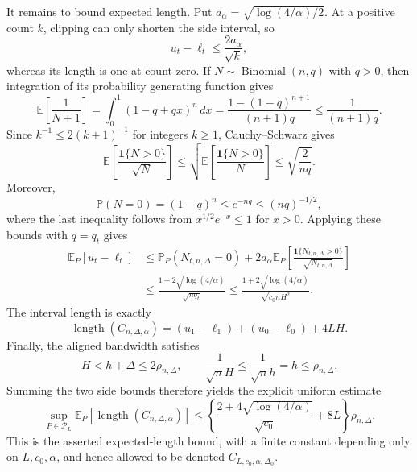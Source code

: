 It remains to bound expected length.  Put \(a_\alpha=\sqrt{\log(4/\alpha)/2}\).  At a positive count \(k\), clipping can only shorten the side interval, so
\[
 u_t-\ell_t\leq\frac{2a_\alpha}{\sqrt{k}},
\]
whereas its length is one at count zero.  If \(N\sim\operatorname{Binomial}(n,q)\) with \(q>0\), then integration of its probability generating function gives
\[
 \mathbb E\!\left[\frac1{N+1}\right]
 =\int_0^1(1-q+qx)^n\,dx
 =\frac{1-(1-q)^{n+1}}{(n+1)q}
 \leq\frac1{(n+1)q}.
\]
Since \(k^{-1}\leq2(k+1)^{-1}\) for integers \(k\geq1\), Cauchy--Schwarz gives
\[
 \mathbb E\!\left[\frac{\mathbf1\{N>0\}}{\sqrt N}\right]
 \leq\sqrt{\mathbb E\!\left[\frac{\mathbf1\{N>0\}}N\right]}
 \leq\sqrt{\frac2{nq}}.
\]
Moreover,
\[
 \mathbb P(N=0)=(1-q)^n\leq e^{-nq}\leq(nq)^{-1/2},
\]
where the last inequality follows from \(x^{1/2}e^{-x}\leq1\) for \(x>0\).  Applying these bounds with \(q=q_t\) gives
\[
 \begin{aligned}
 \mathbb E_P[u_t-\ell_t]
 &\leq \mathbb P_P(N_{t,n,\Delta}=0)
   +2a_\alpha\mathbb E_P\!\left[
      \frac{\mathbf1\{N_{t,n,\Delta}>0\}}{\sqrt{N_{t,n,\Delta}}}
    \right]\\
 &\leq\frac{1+2\sqrt{\log(4/\alpha)}}{\sqrt{nq_t}}
 \leq\frac{1+2\sqrt{\log(4/\alpha)}}{\sqrt{c_0nH^2}}.
 \end{aligned}
\]
The interval length is exactly
\[
 \operatorname{length}(C_{n,\Delta,\alpha})
 =(u_1-\ell_1)+(u_0-\ell_0)+4LH.
\]
Finally, the aligned bandwidth satisfies
\[
 H<h+\Delta\leq2\rho_{n,\Delta},
 \qquad
 \frac1{\sqrt nH}\leq\frac1{\sqrt nh}=h\leq\rho_{n,\Delta}.
\]
Summing the two side bounds therefore yields the explicit uniform estimate
\[
 \sup_{P\in\mathcal P_L}\mathbb E_P[\operatorname{length}(C_{n,\Delta,\alpha})]
 \leq
 \left\{
 \frac{2+4\sqrt{\log(4/\alpha)}}{\sqrt{c_0}}+8L
 \right\}\rho_{n,\Delta}.
\]
This is the asserted expected-length bound, with a finite constant depending only on \(L,c_0,\alpha\), and hence allowed to be denoted \(C_{L,c_0,\alpha,\Delta_0}\).
